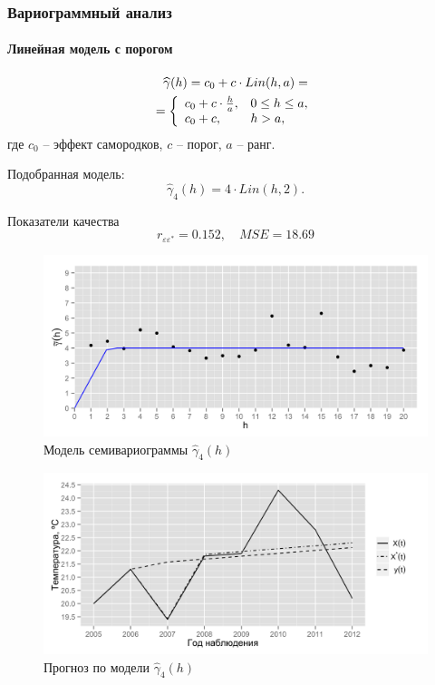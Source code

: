 \documentclass{beamer}
\begin{document}
\begin{frame}
  \frametitle{Вариограммный анализ}
  \framesubtitle{Линейная модель с порогом}
  \begin{multicols}{2}
  \begin{equation}\begin{gathered}
  \label{eq:linsill}
    \widehat{\gamma}(h) = c_0 + c \cdot Lin(h, a) = \\
    = \left\{
    \begin{array}{l l}
     c_0 + c \cdot \frac{h}{a}, & 0 \leq h \leq a, \\
     c_0 + c, & h > a,
    \end{array} \right.
  \end{gathered}\end{equation}
  где $ c_0 $ -- эффект самородков, $ c $ -- порог, $ a $ -- ранг.

  \medskip

  Подобранная модель:
  \begin{equation}
  \label{eq:gamma4}
    \widehat{\gamma}_4(h) = 4 \cdot Lin(h, 2).
  \end{equation}

  Показатели качества
  \begin{equation*}
    r_{\varepsilon\varepsilon^{*}} = 0.152, \quad MSE = 18.69
  \end{equation*}

  \columnbreak
  \vspace{-14.5pt}
  \begin{figure}[H]
    \includegraphics[width=0.9\linewidth]{../../figures/variogram/lin-fit-adapt-modeled.png} \\
    \caption{Модель семивариограммы $\widehat{\gamma}_4(h)$}
    \includegraphics[width=0.9\linewidth]{../../figures/variogram/lin-fit-adapt-cross-prediction.png}
    \caption{Прогноз по модели $\widehat{\gamma}_4(h)$}
  \end{figure}
  \end{multicols}
\end{frame}
\end{document}
